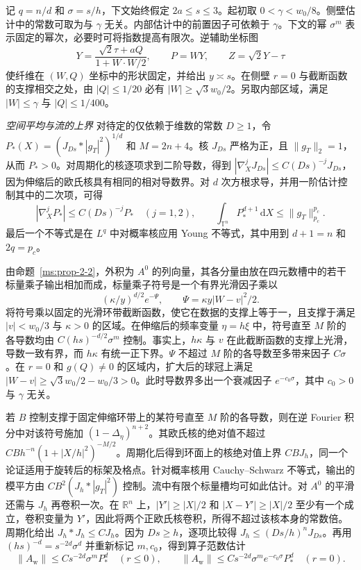 记 $q=n/d$ 和 $\sigma=s/h$，下文始终假定 $2a\le s\le3$。起初取 $0<\gamma<w_0/8$。侧壁估计中的常数可取为与 $\gamma$ 无关。内部估计中的前置因子可依赖于 $\gamma$。下文的幂 $\sigma^m$ 表示固定的幂次，必要时可将指数提高有限次。逆辅助坐标图
\[
Y=\frac{\sqrt2\tau+aQ}{1+W\cdot W/2},\qquad P=WY,\qquad Z=\sqrt2Y-\tau
\]
使纤维在 $(W,Q)$ 坐标中的形状固定，并给出 $y\asymp s$。在侧壁 $r=0$ 与截断函数的支撑相交之处，由 $|Q|\le1/20$ 必有 $|W|\ge\sqrt3w_0/2$。另取内部区域，满足 $|W|\le\gamma$ 与 $|Q|\le1/400$。

\smallskip
\noindent\textit{空间平均与流的上界}
对待定的仅依赖于维数的常数 $D\ge1$，令 $P_*(X)=(J_{Ds}*|g_T|^2)^{1/d}$ 和 $M=2n+4$。核 $J_{Ds}$ 严格为正，且 $\|g_T\|_2=1$，从而 $P_*>0$。对周期化的核逐项求到二阶导数，得到 $|\nabla_X^j J_{Ds}|\le C(Ds)^{-j}J_{Ds}$，因为伸缩后的欧氏核具有相同的相对导数界。对 $d$ 次方根求导，并用一阶估计控制其中的二次项，可得
\[
|\nabla_X^j P_*|\le C(Ds)^{-j}P_*\quad(j=1,2),\qquad
\int_{\mathbb T^n}P_*^{d+1}\,\mathrm dX\le\|g_T\|_{p_c}^{p_c}.
\]
最后一个不等式是在 $L^q$ 中对概率核应用 Young 不等式，其中用到 $d+1=n$ 和 $2q=p_c$。

由命题~\ref{ms:prop-2-2}，外积为 $A^0$ 的列向量，其各分量由放在四元数槽中的若干标量乘子输出相加而成，标量乘子符号是一个有界光滑因子乘以
\[
(\kappa/y)^{d/2}e^{-\Psi},\qquad \Psi=\kappa y|W-v|^2/2.
\]
将符号乘以固定的光滑环带截断函数，使它在数据的支撑上等于一，且支撑于满足 $|v|<w_0/3$ 与 $\kappa>0$ 的区域。在伸缩后的频率变量 $\eta=h\xi$ 中，符号直至 $M$ 阶的各导数均由 $C(hs)^{-d/2}\sigma^m$ 控制。事实上，$h\kappa$ 与 $v$ 在此截断函数的支撑上光滑，导数一致有界，而 $h\kappa$ 有统一正下界。$\Psi$ 不超过 $M$ 阶的各导数至多带来因子 $C\sigma$。在 $r=0$ 和 $g(Q)\ne0$ 的区域内，扩大后的球冠上满足 $|W-v|\ge\sqrt3w_0/2-w_0/3>0$。此时导数界多出一个衰减因子 $e^{-c_0\sigma}$，其中 $c_0>0$ 与 $\gamma$ 无关。

若 $B$ 控制支撑于固定伸缩环带上的某符号直至 $M$ 阶的各导数，则在逆 Fourier 积分中对该符号施加 $(1-\Delta_\eta)^{n+2}$。其欧氏核的绝对值不超过 $CBh^{-n}(1+|X/h|^2)^{-M/2}$。周期化后得到环面上的核绝对值上界 $CBJ_h$，同一个论证适用于旋转后的标架及格点。针对概率核用 Cauchy--Schwarz 不等式，输出的模平方由 $CB^2(J_h*|g_T|^2)$ 控制。流中有限个标量槽均可如此估计。对 $A^0$ 的平滑还需与 $J_h$ 再卷积一次。在 $\mathbb R^n$ 上，$|Y'|\ge |X|/2$ 和 $|X-Y'|\ge |X|/2$ 至少有一个成立，卷积变量为 $Y'$，因此将两个正欧氏核卷积，所得不超过该核本身的常数倍。周期化给出 $J_h*J_h\le CJ_h$。因为 $Ds\ge h$，逐项比较得 $J_h\le(Ds/h)^nJ_{Ds}$。再用 $(hs)^{-d}=s^{-2d}\sigma^d$ 并重新标记 $m,c_0$，得到算子范数估计
\[
\|A_{\mathrm w}\|\le Cs^{-2d}\sigma^mP_*^d\quad(r\le0),\qquad
\|A_{\mathrm w}\|\le Cs^{-2d}\sigma^m e^{-c_0\sigma}P_*^d\quad(r=0).
\]

